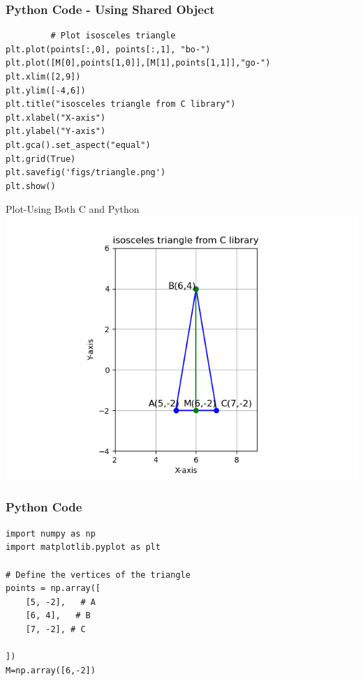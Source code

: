 \documentclass{beamer}
\begin{document}
\begin{frame}[fragile]
     \frametitle{Python Code - Using Shared Object}
     \begin{lstlisting}
         # Plot isosceles triangle
plt.plot(points[:,0], points[:,1], "bo-")
plt.plot([M[0],points[1,0]],[M[1],points[1,1]],"go-")
plt.xlim([2,9])
plt.ylim([-4,6])
plt.title("isosceles triangle from C library")
plt.xlabel("X-axis")
plt.ylabel("Y-axis")
plt.gca().set_aspect("equal")
plt.grid(True)
plt.savefig('figs/triangle.png')
plt.show()
     \end{lstlisting}
     \end{frame}


\begin{frame}{Plot-Using Both C and Python}
    \centering
    \includegraphics[width=\columnwidth, height=0.8\textheight, keepaspectratio]{figs/triangle.png}     
\end{frame}

\begin{frame}[fragile]
    \frametitle{Python Code}
    \begin{lstlisting}
import numpy as np
import matplotlib.pyplot as plt

# Define the vertices of the triangle
points = np.array([
    [5, -2],   # A
    [6, 4],   # B
    [7, -2], # C

])
M=np.array([6,-2])





\end{lstlisting}
\end{frame}
\end{document}
